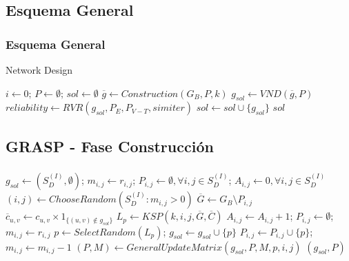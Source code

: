 \subsection{Esquema General}
\begin{frame}\frametitle{Esquema General}
    \begin{block}{Network Design}
\begin{algorithm}[H]
\caption{$sol = NetworkDesign(G_B,iter,k,p_{min},P_E,P_{V-T},simiter)$}
\begin{algorithmic}[1]
\begin{small}    
\STATE $i \leftarrow 0; \, P \leftarrow \emptyset; \, sol \leftarrow \emptyset$
\STATE $\overline{g} \leftarrow Construction(G_B,P,k)$
\STATE $g_{sol} \leftarrow VND(\overline{g},P)$
\STATE $reliability \leftarrow RVR(g_{sol},P_E,P_{V-T},simiter)$
\STATE $sol \leftarrow sol \cup \{g_{sol}\}$
\ENDIF
\ENDWHILE
\RETURN $sol$
\end{small}
\end{algorithmic}
\end{algorithm}
    \end{block}
\end{frame}

\subsection{GRASP - Fase Construcción}
\begin{frame}\frametitle{}
    \begin{block}{}
\begin{algorithm}[H]
\caption{$(sol,P) = Construction(G_B,C,R,k)$}
\begin{algorithmic}[1]
\begin{scriptsize}
\STATE $g_{sol} \leftarrow (S_D^{(I)},\emptyset)$; $m_{i,j}\leftarrow r_{i,j}$; $P_{i,j}\leftarrow \emptyset, \forall i,j \in S_{D}^{(I)}$; $A_{i,j}\leftarrow 0, \forall i,j \in S_{D}^{(I)}$
\STATE $(i,j) \leftarrow ChooseRandom(S_{D}^{(I)}: m_{i,j}>0)$
\STATE $\overline{G} \leftarrow G_B \setminus P_{i,j}$
\STATE $\overline{c}_{u,v} \leftarrow c_{u,v} \times 1_{\{(u,v) \notin g_{sol}\}}$
\ENDFOR
\STATE $L_p \leftarrow KSP(k,i,j,\overline{G},\overline{C})$
\STATE $A_{i,j} \leftarrow A_{i,j}+1$; $P_{i,j} \leftarrow \emptyset$; $m_{i,j}\leftarrow r_{i,j}$ 
\ELSE 
\STATE $p \leftarrow SelectRandom(L_p)$; $g_{sol} \leftarrow g_{sol} \cup \{p\}$
\STATE $P_{i,j} \leftarrow P_{i,j} \cup \{p\}$; $m_{i,j} \leftarrow m_{i,j}-1$
\STATE $(P,M) \leftarrow GeneralUpdateMatrix(g_{sol},P,M,p,i,j)$
\ENDIF
\ENDWHILE
\RETURN $(g_{sol},P)$
\end{scriptsize}    
\end{algorithmic}
\end{algorithm}
\end{block}
\end{frame}

